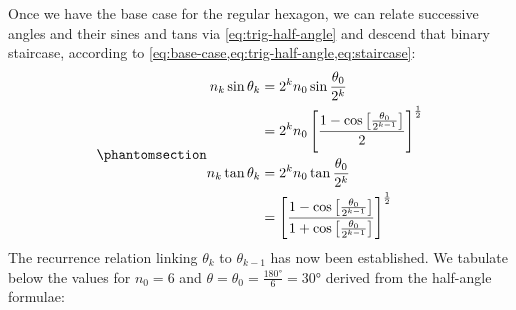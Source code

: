 \documentclass[
  a4paper,
]{article}
\begin{document}
Once we have the base case for the regular hexagon, we can relate
successive angles and their sines and tans via \cref{eq:trig-half-angle}
and descend that binary staircase, according to
\cref{eq:base-case,eq:trig-half-angle,eq:staircase}:
\begin{equation}\phantomsection\label{eq:staircase}{
\begin{aligned}
n_{k}\sin\theta_{k} &= 2^{k}n_{0}\sin\frac{\theta_{0}}{2^{k}}\\
&= 2^{k}n_{0}\left[\frac{1-\cos\left[\frac{\theta_{0}}{2^{k-1}}\right]}{2}\right]^{\frac{1}{2}}\\
n_{k}\tan\theta_{k} &= 2^{k}n_{0}\tan\frac{\theta_{0}}{2^{k}}\\
&= \left[\frac{1-\cos\left[\frac{\theta_{0}}{2^{k-1}}\right]}{1+\cos\left[\frac{\theta_{0}}{2^{k-1}}\right]}\right]^{\frac{1}{2}}
\end{aligned}
}\end{equation} The recurrence relation linking \(\theta_{k}\) to
\(\theta_{k-1}\) has now been established. We tabulate below the values
for \(n_{0} = 6\) and \(\theta = \theta_{0} = \frac{180°}{6} = 30°\)
derived from the half-angle formulae:
\end{document}
